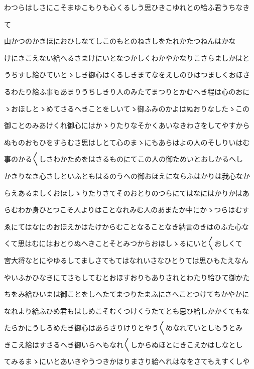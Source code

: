\documentclass[a4paper,11pt,landscape]{ltjtarticle}
\begin{document}
わつらはしさにこそまゆこもりも心くるしう思ひきこゆれとの給ふ君うちなき
\par\medskip
て
\par\medskip
山かつのかきほにおひしなてしこのもとのねさしをたれかたつねんはかな
\par\medskip
けにきこえない給へるさまけにいとなつかしくわかやかなりこさらましかはと
\par\medskip
うちすし給ひていとゝしき御心はくるしきまてなをえしのひはつましくおほさ
\par\medskip
るわたり給ふ事もあまりうちしきり人のみたてまつりとかむへき程は心のおに
\par\medskip
ゝおほしとゝめてさるへきことをしいてゝ御ふみのかよはぬおりなしたゝこの
\par\medskip
御ことのみあけくれ御心にはかゝりたりなそかくあいなきわさをしてやすから
\par\medskip
ぬものおもひをすらむさ思はしとて心のまゝにもあらはよの人のそしりいはむ
\par\medskip
事のかる〱しさわかためをはさるものにてこの人の御ためいとおしかるへし
\par\medskip
かきりなき心さしといふともはるのうへの御おほえにならふはかりは我心なか
\par\medskip
らえあるましくおほしゝりたりさてそのおとりのつらにてはなにはかりかはあ
\par\medskip
らむわか身ひとつこそ人よりはことなれみむ人のあまたか中にかゝつらはむす
\par\medskip
ゑにてはなにのおほえかはたけからむことなることなき納言のきはのふた心な
\par\medskip
くて思はむにはおとりぬへきことそとみつからおほしゝるにいと〱おしくて
\par\medskip
宮大将なとにやゆるしてましさてもてはなれいさなひとりては思ひもたえなん
\par\medskip
やいふかひなきにてさもしてむとおほすおりもありされとわたり給ひて御かた
\par\medskip
ちをみ給ひいまは御ことをしへたてまつりたまふにさへことつけてちかやかに
\par\medskip
なれより給ふひめ君もはしめこそむくつけくうたてとも思ひ給しかかくてもな
\par\medskip
たらかにうしろめたき御心はあらさりけりとやう〱めなれていとしもうとみ
\par\medskip
きこえ給はすさるへき御いらへもなれ〱しからぬほとにきこえかはしなとし
\par\medskip
てみるまゝにいとあいきやうつきかほりまさり給へれはなをさてもえすくしや
\par\medskip
\end{document}
